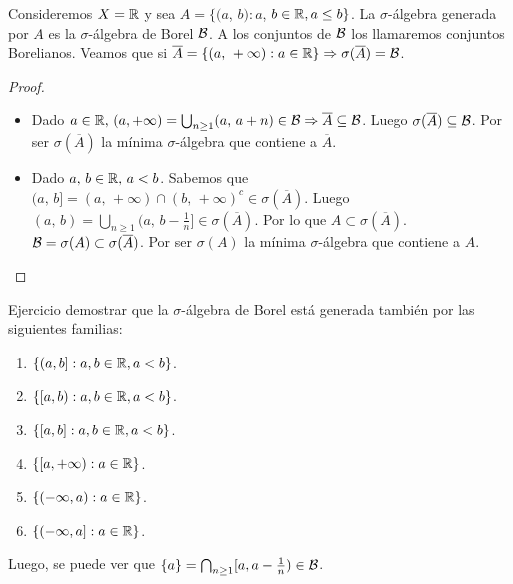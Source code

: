 \begin{eg}
    Consideremos $X = \mathbb{R}$ y sea $A = \{ (a$, $b) : a$, $b \in \mathbb{R}, a \leq b \}$. La $\sigma$-álgebra generada por $A$ es la $\sigma$-álgebra de Borel $\mathcal{B}$.
    A los conjuntos de $\mathcal{B}$ los llamaremos conjuntos Borelianos. Veamos que si $\overline{A} = \{ (a\text{, } +\infty) : a \in \mathbb{R} \} \Rightarrow \sigma(\overline{A}) = \mathcal{B}$.
    \begin{proof}
        \begin{itemize}
            \item Dado $a \in \mathbb{R}\text{, } (a, +\infty) = \bigcup_{n \geq 1} (a\text{, } a+n) \in \mathcal{B} \Rightarrow \overline{A} \subseteq \mathcal{B}$.
                  Luego $\sigma(\overline{A}) \subseteq \mathcal{B}$. Por ser $\sigma(\overline{A})$ la mínima $\sigma$-álgebra que contiene a $\overline{A}$.
            \item Dado $a\text{, } b \in \mathbb{R} \text{, } a < b$. Sabemos que $(a\text{, } b] = (a\text{, } +\infty) \cap (b\text{, } +\infty)^c \in \sigma(\overline{A})$.
                  Luego $(a\text{, } b) = \bigcup_{n \geq 1} (a\text{, } b - \frac{1}{n}] \in \sigma(\overline{A})$. Por lo que $A \subset \sigma(\overline{A})$.
                  $\mathcal{B} = \sigma(A) \subset \sigma(\overline{A})$. Por ser $\sigma(A)$ la mínima $\sigma$-álgebra que contiene a $A$.
        \end{itemize}
    \end{proof}
\end{eg}

\clearpage

Ejercicio demostrar que la $\sigma$-álgebra de Borel está generada también por las siguientes familias:

\begin{enumerate}
    \item $\{ (a, b] : a, b \in \mathbb{R}, a < b \}$.
    \item $\{ [a, b) : a, b \in \mathbb{R}, a < b \}$.
    \item $\{ [a, b] : a, b \in \mathbb{R}, a < b \}$.
    \item $\{ [a, +\infty) : a \in \mathbb{R} \}$.
    \item $\{ (-\infty, a) : a \in \mathbb{R} \}$.
    \item $\{ (-\infty, a] : a \in \mathbb{R} \}$.
\end{enumerate}

Luego, se puede ver que $\{ a \} = \bigcap_{n \geq 1} [a, a - \frac{1}{n}) \in \mathcal{B}$.